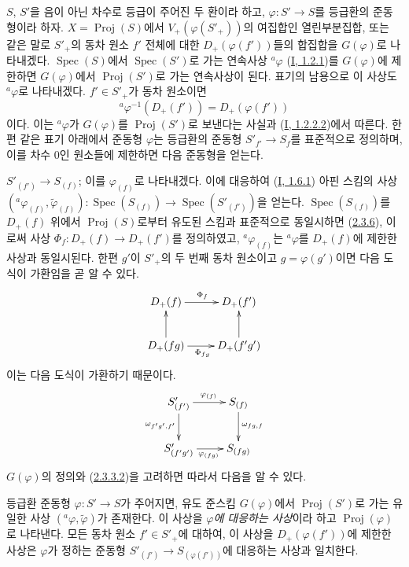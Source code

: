 \begin{env}[2.8.1]
\label{II.2.8.1-ko}
$S$, $S'$을 음이 아닌 차수로 등급이 주어진 두 환이라 하고,
$\varphi:S'\to S$를 등급환의 준동형이라 하자. $X=\operatorname{Proj}(S)$에서
$V_+(\varphi(S'_+))$의 여집합인 열린부분집합, 또는 같은 말로 $S'_+$의
동차 원소 $f'$ 전체에 대한 $D_+(\varphi(f'))$들의 합집합을
$G(\varphi)$로 나타내겠다. $\operatorname{Spec}(S)$에서
$\operatorname{Spec}(S')$로 가는 연속사상 ${}^a\varphi$
(\hyperref[I.1.2.1-ko]{I, 1.2.1})를 $G(\varphi)$에 제한하면
$G(\varphi)$에서 $\operatorname{Proj}(S')$로 가는 연속사상이 된다. 표기의
남용으로 이 사상도 ${}^a\varphi$로 나타내겠다. $f'\in S'_+$가 동차
원소이면
\[
\label{II.2.8.1.1-ko}
  {}^a\varphi^{-1}(D_+(f'))=D_+(\varphi(f'))
\tag{2.8.1.1}
\]
이다. 이는 ${}^a\varphi$가 $G(\varphi)$를 $\operatorname{Proj}(S')$로
보낸다는 사실과 (\hyperref[I.1.2.2.2-ko]{I, 1.2.2.2})에서 따른다. 한편
같은 표기 아래에서 준동형 $\varphi$는 등급환의 준동형
$S'_{f'}\to S_f$를 표준적으로 정의하며, 이를 차수 $0$인 원소들에
제한하면 다음 준동형을 얻는다.

$S'_{(f')}\to S_{(f)}$; 이를 $\varphi_{(f)}$로 나타내겠다. 이에 대응하여
(\hyperref[I.1.6.1-ko]{I, 1.6.1}) 아핀 스킴의 사상
$({}^a\varphi_{(f)},\widetilde{\varphi}_{(f)}):
\operatorname{Spec}(S_{(f)})\to\operatorname{Spec}(S'_{(f')})$을 얻는다.
$\operatorname{Spec}(S_{(f)})$를 $D_+(f)$ 위에서
$\operatorname{Proj}(S)$로부터 유도된 스킴과 표준적으로 동일시하면
(\hyperref[II.2.3.6-ko]{2.3.6}), 이로써 사상
$\Phi_f:D_+(f)\to D_+(f')$를 정의하였고, ${}^a\varphi_{(f)}$는
${}^a\varphi$를 $D_+(f)$에 제한한 사상과 동일시된다. 한편 $g'$이
$S'_+$의 두 번째 동차 원소이고 $g=\varphi(g')$이면 다음 도식이
가환임을 곧 알 수 있다.
\[
  \xymatrix{
    D_+(f)\ar[r]^{\Phi_f} & D_+(f')\\
    D_+(fg)\ar[u]\ar[r]_{\Phi_{fg}} & D_+(f'g')\ar[u]
  }
\]
이는 다음 도식이 가환하기 때문이다.
\[
  \xymatrix{
    S'_{(f')}\ar[r]^{\varphi_{(f)}}\ar[d]_{\omega_{f'g',f'}}
    & S_{(f)}\ar[d]^{\omega_{fg,f}}\\
    S'_{(f'g')}\ar[r]_{\varphi_{(fg)}} & S_{(fg)}
  }
\]
$G(\varphi)$의 정의와 (\hyperref[II.2.3.3.2-ko]{2.3.3.2})을 고려하면
따라서 다음을 알 수 있다.
\end{env}

\begin{proposition}[2.8.2]
\label{II.2.8.2-ko}
등급환 준동형 $\varphi:S'\to S$가 주어지면, 유도 준스킴
$G(\varphi)$에서 $\operatorname{Proj}(S')$로 가는 유일한 사상
$({}^a\varphi,\widetilde{\varphi})$가 존재한다. 이 사상을
\emph{$\varphi$에 대응하는 사상}이라 하고 $\operatorname{Proj}(\varphi)$로
나타낸다. 모든 동차 원소 $f'\in S'_+$에 대하여, 이 사상을
$D_+(\varphi(f'))$에 제한한 사상은 $\varphi$가 정하는 준동형
$S'_{(f')}\to S_{(\varphi(f'))}$에 대응하는 사상과 일치한다.
\end{proposition}

